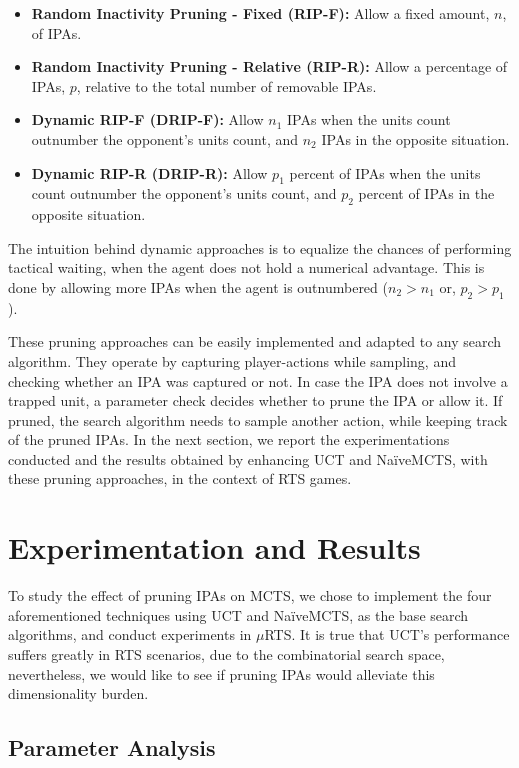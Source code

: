 \documentclass[conference]{IEEEtran}
\newcommand{\mRTS}{$\mu$RTS}
\begin{document}
\begin{itemize}
\item \textbf{Random Inactivity Pruning - Fixed (RIP-F):} Allow a fixed amount, $n$, of IPAs.
\item \textbf{Random Inactivity Pruning - Relative (RIP-R):} Allow a percentage of IPAs, $p$, relative to the total number of removable IPAs.
\item \textbf{Dynamic RIP-F (DRIP-F):} Allow $n_1$ IPAs when the units count outnumber the opponent's units count, and $n_2$ IPAs in the opposite situation.
\item \textbf{Dynamic RIP-R (DRIP-R):} Allow $p_1$ percent of IPAs when the units count outnumber the opponent's units count, and $p_2$ percent of IPAs in the opposite situation.
\end{itemize}

The intuition behind dynamic approaches is to equalize the chances of performing tactical waiting, when the agent does not hold a numerical advantage. This is done by allowing more IPAs when the agent is outnumbered ($n_2 > n_1$ or, $p_2 > p_1$).

These pruning approaches can be easily implemented and adapted to any search algorithm. They operate by capturing player-actions while sampling, and checking whether an IPA was captured or not. In case the IPA does not involve a trapped unit, a parameter check decides whether to prune the IPA or allow it. If pruned, the search algorithm needs to sample another action, while keeping track of the pruned IPAs. In the next section, we report the experimentations conducted and the results obtained by enhancing UCT and NaïveMCTS, with these pruning approaches, in the context of RTS games.

\section{Experimentation and Results}

To study the effect of pruning IPAs on MCTS, we chose to implement the four aforementioned techniques using UCT and NaïveMCTS, as the base search algorithms, and conduct experiments in \mRTS{}. It is true that UCT's performance suffers greatly in RTS scenarios, due to the combinatorial search space, nevertheless, we would like to see if pruning IPAs would alleviate this dimensionality burden. 


\subsection{Parameter Analysis}
\end{document}
